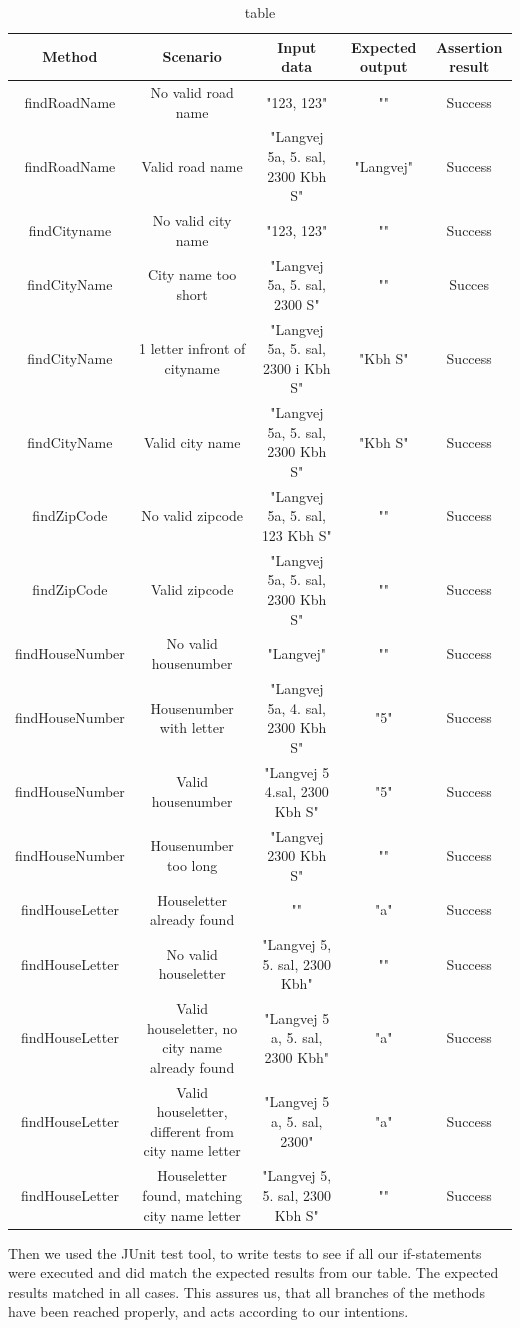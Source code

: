 \documentclass[a4paper,10pt,titlepage]{article}
\begin{document}
\begin{landscape}
\begin{table}
\caption{table}
\centering
\begin{tabular}{c c c c c}
Method & Scenario & Input data & Expected output & Assertion result \\ [0.5ex] 
\hline
findRoadName & No valid road name & "123, 123" & "" & Success\\
findRoadName & Valid road name & "Langvej 5a, 5. sal, 2300 Kbh S" & "Langvej" & Success \\
findCityname & No valid city name & "123, 123" & "" & Success \\
findCityName & City name too short & "Langvej 5a, 5. sal, 2300 S" & "" & Succes\\
findCityName & 1 letter infront of cityname & "Langvej 5a, 5. sal, 2300 i Kbh S" & "Kbh S" & Success \\
findCityName & Valid city name & "Langvej 5a, 5. sal, 2300 Kbh S" & "Kbh S" & Success \\
findZipCode & No valid zipcode & "Langvej 5a, 5. sal, 123 Kbh S" & "" & Success \\
findZipCode & Valid zipcode & "Langvej 5a, 5. sal, 2300 Kbh S" & "" & Success \\
findHouseNumber & No valid housenumber & "Langvej" & "" & Success \\
findHouseNumber &  Housenumber with letter & "Langvej 5a, 4. sal, 2300 Kbh S" & "5" & Success \\
findHouseNumber & Valid housenumber & "Langvej 5 4.sal, 2300 Kbh S" & "5" & Success \\
findHouseNumber & Housenumber too long & "Langvej 2300 Kbh S" & "" & Success \\
findHouseLetter & Houseletter already found & "" & "a" & Success \\
findHouseLetter & No valid houseletter & "Langvej 5, 5. sal, 2300 Kbh" & "" & Success \\
findHouseLetter & Valid houseletter, no city name already found & "Langvej 5 a, 5. sal, 2300 Kbh" & "a" & Success \\
findHouseLetter & Valid houseletter, different from city name letter & "Langvej 5 a, 5. sal, 2300" & "a" & Success \\
findHouseLetter & Houseletter found, matching city name letter & "Langvej 5, 5. sal, 2300 Kbh S" & "" & Success


\end{tabular}
\end{table}
\end{landscape}
Then we used the JUnit test tool, to write tests to see if all our if-statements were executed and did match the expected results from our table. The expected results matched in all cases. This assures us, that all branches of the methods have been reached properly, and acts according to our intentions.
\end{document}
